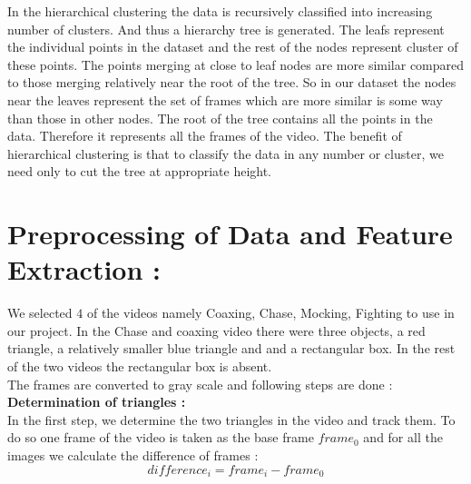 \documentclass[11pt]{report}
\begin{document}
In the hierarchical clustering the data is recursively classified into increasing number of clusters. And thus a hierarchy tree is generated. The leafs represent the individual points in the dataset and the rest of the nodes represent cluster of these points.  The points merging at close to leaf nodes are more similar compared to those merging relatively near the root of the tree. So in our dataset the nodes near the leaves represent the set of frames which are more similar is some way than those in other nodes.
The root of the tree contains all the points in the data. Therefore it represents all the frames of the video. The benefit of hierarchical clustering is that to classify the data in any number or cluster, we need only to cut the tree at appropriate height.\\

\section*{Preprocessing of Data and Feature Extraction : }
We selected $4$ of the videos namely Coaxing, Chase, Mocking, Fighting to use in our project. In the Chase and coaxing video there were three objects, a red triangle, a relatively smaller blue triangle and and a rectangular box. In the rest of the two videos the rectangular box is absent.\\
The frames are converted to gray scale and following steps are done :\\
{\bf Determination of triangles : }\\ \hspace*{10pt} In the first step, we determine the two triangles in the video and track them. To do so one frame of the video is taken as the base frame $frame_0$ and for all the images we calculate the difference of frames :
	$$difference_i = frame_i - frame_0$$
\end{document}
